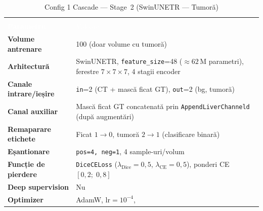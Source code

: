 \documentclass[12pt, a4paper]{report}
\begin{document}
\vspace{6pt}

\begin{table}[H]
\centering
\renewcommand{\arraystretch}{1.3}
\caption{Config 1 Cascade — Stage~2 (SwinUNETR — Tumoră)}
\label{tab:config1_stage2}
\begin{tabular}{>{\bfseries}p{5.5cm} p{8.5cm}}
\multicolumn{2}{>{\columncolor{darkblue}}c}{%
    \textbf{\textcolor{white}{Stage 2 — SwinUNETR (Tumoră)}}} \\
\rowcolor{darkblue}
\textcolor{white}{Parametru} & \textcolor{white}{Valoare} \\
\rowcolor{lightblue} Volume antrenare      & 100 (doar volume cu tumoră) \\
\rowcolor{white}     Arhitectură           & SwinUNETR,
                                             \texttt{feature\_size}=48
                                             ($\approx 62$\,M parametri),
                                             ferestre $7\times7\times7$,
                                             4 stagii encoder \\
\rowcolor{lightblue} Canale intrare/ieșire & \texttt{in}=2
                                             (CT + mască ficat GT),
                                             \texttt{out}=2 (bg, tumoră) \\
\rowcolor{white}     Canal auxiliar        & Mască ficat GT concatenată
                                             prin \texttt{AppendLiverChanneld}
                                             (după augmentări) \\
\rowcolor{lightblue} Remaparare etichete   & Ficat $1\to0$,
                                             tumoră $2\to1$
                                             (clasificare binară) \\
\rowcolor{white}     Eșantionare           & \texttt{pos=4, neg=1},
                                             4 sample-uri/volum \\
\rowcolor{lightblue} Funcție de pierdere   & \texttt{DiceCELoss}
                                             ($\lambda_{\text{Dice}}=0{,}5$,
                                              $\lambda_{\text{CE}}=0{,}5$),
                                             ponderi CE $[0{,}2;\;0{,}8]$ \\
\rowcolor{white}     Deep supervision      & Nu \\
\rowcolor{lightblue} Optimizer             & AdamW,
                                             $\text{lr}=10^{-4}$,

\end{tabular}
\end{table}
\end{document}
